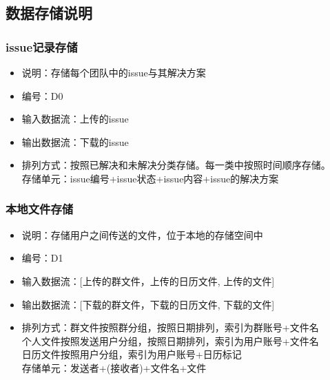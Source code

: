         \subsection{\color{red} 数据存储说明}
        {\color{red}
            \subsubsection{\color{red} issue记录存储}
            \begin{itemize}
            \item 说明：存储每个团队中的issue与其解决方案
            \item 编号：D0
            \item 输入数据流：上传的issue
            \item 输出数据流：下载的issue
            \item 排列方式：按照已解决和未解决分类存储。每一类中按照时间顺序存储。\\
                           存储单元：issue编号+issue状态+issue内容+issue的解决方案\\
            \end{itemize}
        }
            \subsubsection{本地文件存储}
            \begin{itemize}
                \item 说明：存储用户之间传送的文件，位于本地的存储空间中
                \item 编号：D1
                \item 输入数据流：[上传的群文件，上传的日历文件, 上传的文件]
                \item 输出数据流：[下载的群文件，下载的日历文件, 下载的文件]
                \item 排列方式：群文件按照群分组，按照日期排列，索引为群账号+文件名\\
                               个人文件按照发送用户分组，按照日期排列，索引为用户账号+文件名\\
                               日历文件按照用户分组，索引为用户账号+日历标记\\
                               存储单元：发送者+(接收者)+文件名+文件\\
            \end{itemize}
